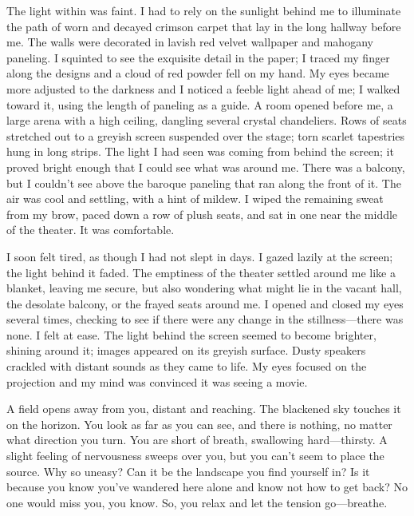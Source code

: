 The light within was faint. I had to rely on the sunlight behind me to
illuminate the path of worn and decayed crimson carpet that lay in the
long hallway before me. The walls were decorated in lavish red velvet
wallpaper and mahogany paneling. I squinted to see the exquisite detail
in the paper; I traced my finger along the designs and a cloud of red
powder fell on my hand. My eyes became more adjusted to the darkness and
I noticed a feeble light ahead of me; I walked toward it, using the
length of paneling as a guide. A room opened before me, a large arena
with a high ceiling, dangling several crystal chandeliers. Rows of seats
stretched out to a greyish screen suspended over the stage; torn scarlet
tapestries hung in long strips. The light I had seen was coming from
behind the screen; it proved bright enough that I could see what was
around me. There was a balcony, but I couldn't see above the baroque
paneling that ran along the front of it. The air was cool and settling,
with a hint of mildew. I wiped the remaining sweat from my brow, paced
down a row of plush seats, and sat in one near the middle of the
theater. It was comfortable.

I soon felt tired, as though I had not slept in days. I gazed lazily at
the screen; the light behind it faded. The emptiness of the theater
settled around me like a blanket, leaving me secure, but also wondering
what might lie in the vacant hall, the desolate balcony, or the frayed
seats around me. I opened and closed my eyes several times, checking to
see if there were any change in the stillness---there was none. I felt
at ease. The light behind the screen seemed to become brighter, shining
around it; images appeared on its greyish surface. Dusty speakers
crackled with distant sounds as they came to life. My eyes focused on
the projection and my mind was convinced it was seeing a movie.

A field opens away from you, distant and reaching. The blackened sky
touches it on the horizon. You look as far as you can see, and there is
nothing, no matter what direction you turn. You are short of breath,
swallowing hard---thirsty. A slight feeling of nervousness sweeps over
you, but you can't seem to place the source. Why so uneasy? Can it be
the landscape you find yourself in? Is it because you know you've
wandered here alone and know not how to get back? No one would miss you,
you know. So, you relax and let the tension go---breathe.


